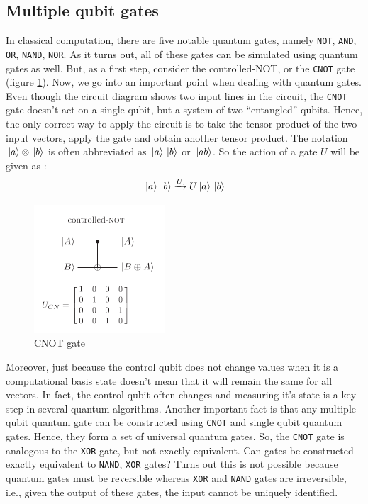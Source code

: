 \documentclass[conference]{IEEEtran}
\begin{document}
\subsection{Multiple qubit gates}
In classical computation, there are five notable quantum gates, namely \verb|NOT|, \verb|AND|, \verb|OR|, \verb|NAND|, \verb|NOR|. As it turns out, 
all of these gates can be simulated using quantum gates as well. But, as a first step, consider the controlled-NOT, or the \verb|CNOT| gate (figure \ref{cnot}).
Now, we go into an important point when dealing with quantum gates. Even though the circuit diagram shows two input lines in the circuit, the \verb|CNOT| gate doesn't act on 
a single qubit, but a system of two ``entangled'' qubits. Hence, the only correct way to apply the circuit is to take the tensor product of the two input vectors, apply the gate and obtain 
another tensor product. The notation $\ket*{a} \otimes \ket*{b}$ is often abbreviated as $\ket*{a}\ket*{b}$ or $\ket*{ab}$. So the action of a gate $U$ will be given as : 
\begin{equation*}
    \ket*{a}\ket*{b} \xrightarrow[]{U} U\ket*{a}\ket*{b}
\end{equation*}

\begin{figure}[htbp]
\centerline{\includegraphics[scale = 0.7]{Images/cnot.png}}
\caption{CNOT gate}
\label{cnot}
\end{figure}

Moreover, just because the control qubit does not change values when it is a computational basis state doesn't mean that it will remain the same for all vectors. In fact, 
the control qubit often changes and measuring it's state is a key step in several quantum algorithms. Another important fact is that 
any multiple qubit quantum gate can be constructed using \verb|CNOT| and single qubit quantum gates. Hence, they form a set of universal quantum gates.
So, the \verb|CNOT| gate is analogous to the \verb|XOR| gate, but not exactly equivalent. Can gates be constructed exactly equivalent to \verb|NAND|, \verb|XOR| gates? Turns out this is 
not possible because quantum gates must be reversible whereas \verb|XOR| and \verb|NAND| gates are irreversible, i.e., given the output of these gates, the input cannot be uniquely identified. 
\end{document}
